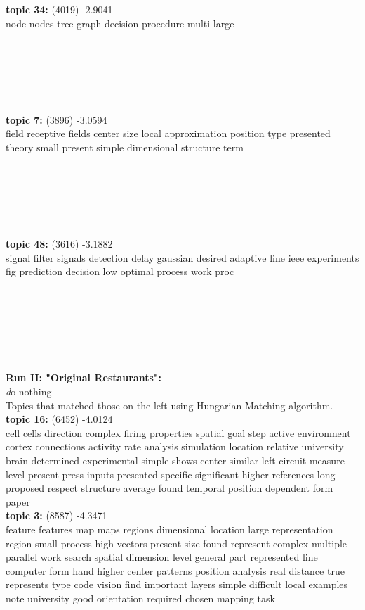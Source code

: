 \documentclass{article}
\begin{document}
\begin{spacing}{1.1}
\begin{table}[ht]
\begin{minipage}[b]{0.5\linewidth}
{\bf topic 34:} (4019)  -2.9041\\
node nodes tree graph decision procedure multi large \\\\\\\\\\\\\\
{\bf topic 7:} (3896)  -3.0594\\
field receptive fields center size local approximation position type presented theory small present simple dimensional structure term \\\\\\\\\\\\\\
{\bf topic 48:} (3616)  -3.1882\\
signal filter signals detection delay gaussian desired adaptive line ieee experiments fig prediction decision low optimal process work proc \\\\\\\\\\\\\\
\end{minipage}
\hspace{0.5cm}
\begin{minipage}[b]{0.5\linewidth}
\begin{center}
{\bf Run II: "Original Restaurants":}\\
{\emph do nothing}\\
Topics that matched those on the left using Hungarian Matching algorithm.\\
{\bf topic 16:} (6452) -4.0124\\
cell cells direction complex firing properties spatial goal step active environment cortex connections activity rate analysis simulation location relative university brain determined experimental simple shows center similar left circuit measure level present press inputs presented specific significant higher references long proposed respect structure average found temporal position dependent form paper \\
{\bf topic 3:} (8587) -4.3471\\
feature features map maps regions dimensional location large representation region small process high vectors present size found represent complex multiple parallel work search spatial dimension level general part represented line computer form hand higher center patterns position analysis real distance true represents type code vision find important layers simple difficult local examples note university good orientation required chosen mapping task \\

\end{center}
\end{minipage}
\end{table}
\end{spacing}
\end{document}
